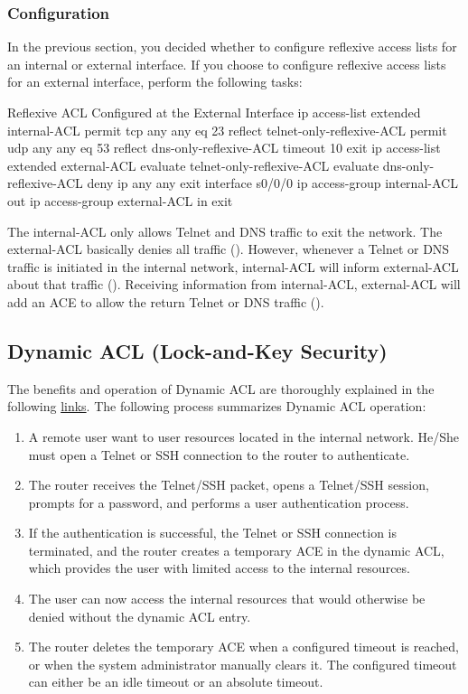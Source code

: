 \subsubsection{Configuration}

In the previous section, you decided whether to configure reflexive access lists for an internal or external interface. If you choose to configure reflexive access lists for an external interface, perform the following tasks:

\begin{sexylisting}{Reflexive ACL Configured at the External Interface}
ip access-list extended internal-ACL
	permit tcp any any eq 23 reflect telnet-only-reflexive-ACL
	permit udp any any eq 53 reflect dns-only-reflexive-ACL timeout 10
	exit
ip access-list extended external-ACL
	evaluate telnet-only-reflexive-ACL
	evaluate dns-only-reflexive-ACL
	deny ip any any
	exit
interface s0/0/0
	ip access-group internal-ACL out
	ip access-group external-ACL in
	exit
\end{sexylisting}

The internal-ACL only allows Telnet and DNS traffic to exit the network. The external-ACL basically denies all traffic (). However, whenever a Telnet or DNS traffic is initiated in the internal network, internal-ACL will inform external-ACL about that traffic (). Receiving information from internal-ACL, external-ACL will add an ACE to allow the return Telnet or DNS traffic ().

\subsection{Dynamic ACL (Lock-and-Key Security)}

The benefits and operation of Dynamic ACL are thoroughly explained in the following \href{https://www.youtube.com/watch?v=1EwutKdb6P8&index=2&list=PLyykP25PsLMKk1cKoCtEzRTsjuJ0rbbhl }{links}. The following process summarizes Dynamic ACL operation:

\begin{enumerate}
\item A remote user want to user resources located in the internal network. He/She must open a Telnet or SSH connection to the router to authenticate.
\item The router receives the Telnet/SSH packet, opens a Telnet/SSH session, prompts for a password, and performs a user authentication process. 
\item If the authentication is successful, the Telnet or SSH connection is terminated, and the router creates a
temporary ACE in the dynamic ACL, which provides the user with limited access to the internal resources.
\item The user can now access the internal resources that would otherwise be denied without the dynamic ACL entry.
\item The router deletes the temporary ACE when a configured timeout is reached, or when the system administrator manually clears it. The configured timeout can either be an idle timeout or an absolute timeout. 
\end{enumerate}

